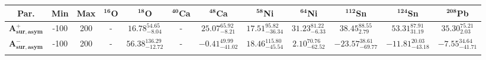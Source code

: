 \bgroup
\def\arraystretch{1.5}%
\begin{tabular}{ c c c c c c c c c c c c} 
\textbf{Par.} & \textbf{Min} & \textbf{Max} & \textbf{$\mathbf{^{16}}$O}& \textbf{$\mathbf{^{18}}$O}& \textbf{$\mathbf{^{40}}$Ca}& \textbf{$\mathbf{^{48}}$Ca}& \textbf{$\mathbf{^{58}}$Ni}& \textbf{$\mathbf{^{64}}$Ni}& \textbf{$\mathbf{^{112}}$Sn}& \textbf{$\mathbf{^{124}}$Sn}& \textbf{$\mathbf{^{208}}$Pb}\\
 \hline 
$\mathbf{A_{sur,asym}^{+}}$ & -100 & 200 & - & $16.78^{54.65}_{-8.04}$ & - & $25.07^{65.92}_{-8.21}$ & $17.51^{95.82}_{-36.34}$ & $31.23^{81.22}_{-6.33}$ & $38.45^{88.55}_{2.79}$ & $53.31^{87.91}_{31.19}$ & $35.30^{75.21}_{2.03}$\\ 
$\mathbf{A_{sur,asym}^{-}}$ & -100 & 200 & - & $56.38^{136.29}_{-12.72}$ & - & $-0.41^{49.99}_{-41.02}$ & $18.46^{115.80}_{-45.54}$ & $2.10^{70.76}_{-62.52}$ & $-23.57^{38.61}_{-69.77}$ & $-11.81^{20.03}_{-43.18}$ & $-7.55^{34.64}_{-41.71}$\\ 
\\ 
\end{tabular}
\egroup